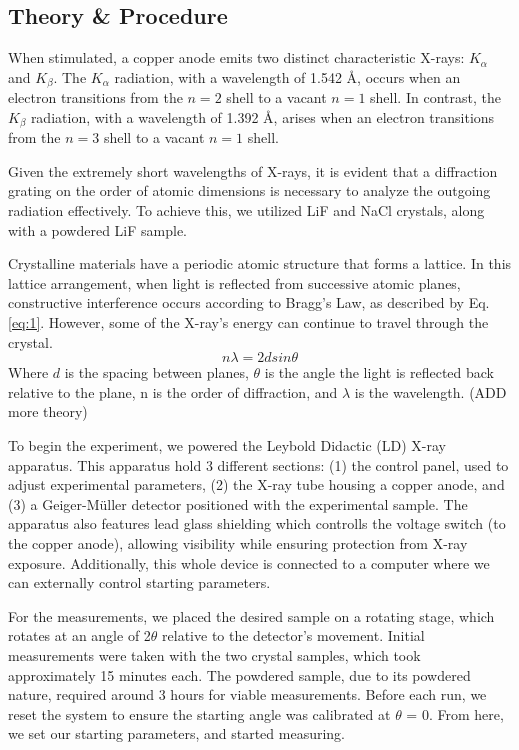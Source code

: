 \documentclass[a4paper,12pt,english]{all-in-one} %
\newcommand\tab[1][1cm]{\hspace*{#1}}
\begin{document}
\begin{multicols}{2}

\section*{Theory \& Procedure}
{
\tab When stimulated, a copper anode emits two distinct characteristic X-rays: $K_\alpha$ and $K_\beta$. The $K_\alpha$ radiation, with a wavelength of 1.542 Å, occurs when an electron transitions from the $n=2$ shell to a vacant $n=1$ shell. In contrast, the $K_\beta$ radiation, with a wavelength of 1.392 Å, arises when an electron transitions from the $n=3$ shell to a vacant $n=1$ shell.

Given the extremely short wavelengths of X-rays, it is evident that a diffraction grating on the order of atomic dimensions is necessary to analyze the outgoing radiation effectively. To achieve this, we utilized LiF and NaCl crystals, along with a powdered LiF sample.

Crystalline materials have a periodic atomic structure that forms a lattice. In this lattice arrangement, when light is reflected from successive atomic planes, constructive interference occurs according to Bragg's Law, as described by Eq.\eqref{eq:1}. However, some of the X-ray's energy can continue to travel through the crystal.
\begin{equation}\label{eq:1}
    n\lambda = 2dsin\theta
\end{equation}
Where $d$ is the spacing between planes, $\theta$ is the angle the light is reflected back relative to the plane, n is the order of diffraction, and $\lambda$ is the wavelength.
(ADD more theory)

To begin the experiment, we powered the Leybold Didactic (LD) X-ray apparatus. This apparatus hold 3 different sections: (1) the control panel, used to adjust experimental parameters, (2) the X-ray tube housing a copper anode, and (3) a Geiger-Müller detector positioned with the experimental sample. The apparatus also features lead glass shielding which controlls the voltage switch (to the copper anode), allowing visibility while ensuring protection from X-ray exposure. Additionally, this whole device is connected to a computer where we can externally control starting parameters. 

For the measurements, we placed the desired sample on a rotating stage, which rotates at an angle of 2$\theta$ relative to the detector’s movement. Initial measurements were taken with the two crystal samples, which took approximately 15 minutes each. The powdered sample, due to its powdered nature, required around 3 hours for viable measurements. Before each run, we reset the system to ensure the starting angle was calibrated at $\theta$ = 0. From here, we set our starting parameters, and started measuring.  
}
    

\end{multicols}
\end{document}
